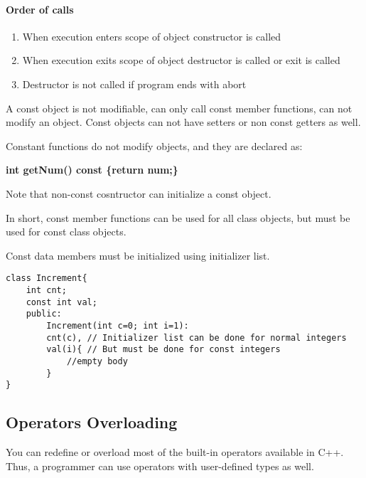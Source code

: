 \documentclass{article}
\begin{document}
\paragraph{Order of calls }
\begin{enumerate}[1.]
\item When execution enters scope of object constructor is called
\item When execution exits scope of object destructor is called or exit is called
\item Destructor is not called if program ends with abort
\end{enumerate}

A const object is not modifiable, can only call const member functions, can not modify an object. Const objects can not have setters or non const getters as well.

Constant functions do not modify objects, and they are declared as: 

\textbf{ int getNum() const \{return num;\} }

Note that non-const cosntructor can initialize a const object.

In short, const member functions can be used for all class objects, but must be used for const class objects. 

Const data members must be initialized using initializer list.

\begin{lstlisting}
class Increment{
	int cnt;
	const int val;
	public:
		Increment(int c=0; int i=1):
		cnt(c), // Initializer list can be done for normal integers
		val(i){ // But must be done for const integers
			//empty body
		} 
}
\end{lstlisting}

\subsection{Operators Overloading}
You can redefine or overload most of the built-in operators available in C++. Thus, a programmer can use operators with user-defined types as well.
\end{document}
